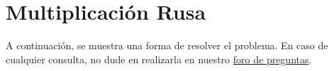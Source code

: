 \section{Multiplicación Rusa}
A continuación, se muestra una forma de resolver el problema. En caso de cualquier consulta, no dude en realizarla en nuestro \href{https://aula.usm.cl/mod/forum/view.php?id=2654494}{foro de preguntas}.



